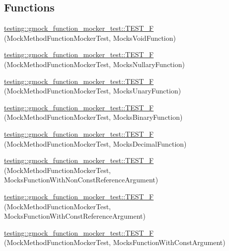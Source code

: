 \subsection*{Functions}
\begin{DoxyCompactItemize}
\item 
\mbox{\hyperlink{namespacetesting_1_1gmock__function__mocker__test_ae7f9fb0bb0ecf0b1ba4b82886b90ab2f}{testing\+::gmock\+\_\+function\+\_\+mocker\+\_\+test\+::\+T\+E\+S\+T\+\_\+F}} (Mock\+Method\+Function\+Mocker\+Test, Mocks\+Void\+Function)
\item 
\mbox{\hyperlink{namespacetesting_1_1gmock__function__mocker__test_a3514268360556d12bef3a1c82f45281b}{testing\+::gmock\+\_\+function\+\_\+mocker\+\_\+test\+::\+T\+E\+S\+T\+\_\+F}} (Mock\+Method\+Function\+Mocker\+Test, Mocks\+Nullary\+Function)
\item 
\mbox{\hyperlink{namespacetesting_1_1gmock__function__mocker__test_a35a551fadacfb985595cbd55aaf796d9}{testing\+::gmock\+\_\+function\+\_\+mocker\+\_\+test\+::\+T\+E\+S\+T\+\_\+F}} (Mock\+Method\+Function\+Mocker\+Test, Mocks\+Unary\+Function)
\item 
\mbox{\hyperlink{namespacetesting_1_1gmock__function__mocker__test_a6f8ae8af75ac1a91607a7d441f5b3a0e}{testing\+::gmock\+\_\+function\+\_\+mocker\+\_\+test\+::\+T\+E\+S\+T\+\_\+F}} (Mock\+Method\+Function\+Mocker\+Test, Mocks\+Binary\+Function)
\item 
\mbox{\hyperlink{namespacetesting_1_1gmock__function__mocker__test_a7b51041faea5674afd2651cc0eab7a17}{testing\+::gmock\+\_\+function\+\_\+mocker\+\_\+test\+::\+T\+E\+S\+T\+\_\+F}} (Mock\+Method\+Function\+Mocker\+Test, Mocks\+Decimal\+Function)
\item 
\mbox{\hyperlink{namespacetesting_1_1gmock__function__mocker__test_a0211ece323793b32efe40c05d876e1f8}{testing\+::gmock\+\_\+function\+\_\+mocker\+\_\+test\+::\+T\+E\+S\+T\+\_\+F}} (Mock\+Method\+Function\+Mocker\+Test, Mocks\+Function\+With\+Non\+Const\+Reference\+Argument)
\item 
\mbox{\hyperlink{namespacetesting_1_1gmock__function__mocker__test_ac0755c3a4372fef8430643ad1ee6dead}{testing\+::gmock\+\_\+function\+\_\+mocker\+\_\+test\+::\+T\+E\+S\+T\+\_\+F}} (Mock\+Method\+Function\+Mocker\+Test, Mocks\+Function\+With\+Const\+Reference\+Argument)
\item 
\mbox{\hyperlink{namespacetesting_1_1gmock__function__mocker__test_ad1ec731c33bee156a56536aa26dd9441}{testing\+::gmock\+\_\+function\+\_\+mocker\+\_\+test\+::\+T\+E\+S\+T\+\_\+F}} (Mock\+Method\+Function\+Mocker\+Test, Mocks\+Function\+With\+Const\+Argument)

\end{DoxyCompactItemize}
